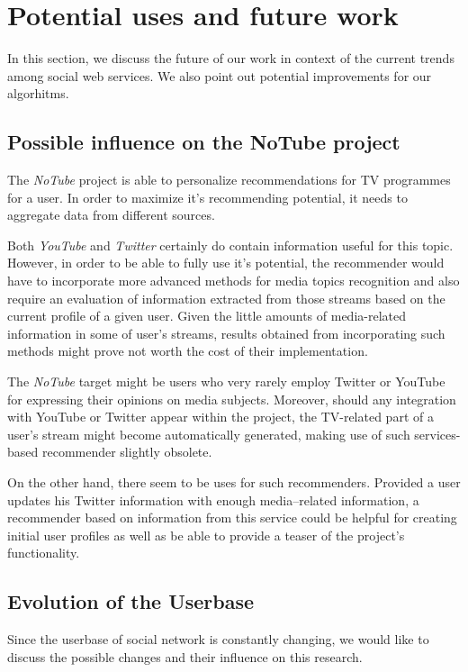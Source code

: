 \section{Potential uses and future work}

In this section, we discuss the future of our work in context of the current
trends among social web services. We also point out potential improvements for
our algorhitms.

\subsection{Possible influence on the NoTube project}

The \textit{NoTube} project is able to personalize recommendations for TV
programmes for a user. In order to maximize it's recommending potential, it
needs to aggregate data from different sources.

Both \textit{YouTube} and \textit{Twitter} certainly do contain information
useful for this topic. However, in order to be able to fully use it's
potential, the recommender would have to incorporate more advanced methods for
media topics recognition and also require an evaluation of information
extracted from those streams based on the current profile of a given user.
Given the little amounts of media-related information in some of user's
streams, results obtained from incorporating such methods might prove not worth
the cost of their implementation.

The \textit{NoTube} target might be users who very rarely employ Twitter or
YouTube for expressing their opinions on media subjects. Moreover, should any
integration with YouTube or Twitter appear within the project, the TV-related
part of a user's stream might become automatically generated, making use of
such services-based recommender slightly obsolete.

On the other hand, there seem to be uses for such recommenders. Provided a user
updates his Twitter information with enough media--related information, a
recommender based on information from this service could be helpful for
creating initial user profiles as well as be able to provide a teaser of the
project's functionality.

\subsection{Evolution of the Userbase}

Since the userbase of social network is constantly changing, we would like to
discuss the possible changes and their influence on this research.

